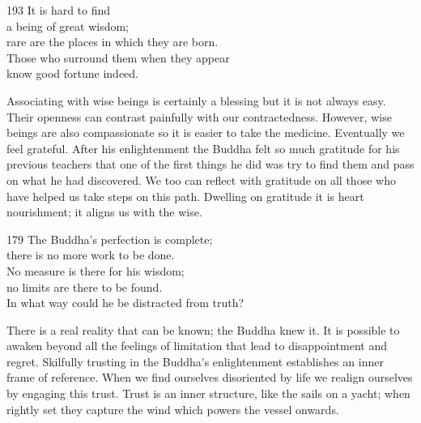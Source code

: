 
\begin{dhpVerse}{193}
\label{dhp-193}
It is hard to find\\
a being of great wisdom;\\
rare are the places in which they are born.\\
Those who surround them when they appear\\
know good fortune indeed.
\end{dhpVerse}

\begin{dhpRefl}

Associating with wise beings is certainly a blessing but it is not
always easy. Their openness can contrast painfully with our
contractedness. However, wise beings are also compassionate so it is
easier to take the medicine. Eventually we feel grateful. After his
enlightenment the Buddha felt so much gratitude for his previous
teachers that one of the first things he did was try to find them and
pass on what he had discovered. We too can reflect with gratitude on
all those who have helped us take steps on this path. Dwelling on
gratitude it is heart nourishment; it aligns us with the wise.

\end{dhpRefl}


\begin{dhpVerse}{179}
\label{dhp-179}
The Buddha's perfection is complete;\\
there is no more work to be done.\\
No measure is there for his wisdom;\\
no limits are there to be found.\\
In what way could he be distracted from truth?
\end{dhpVerse}

\begin{dhpRefl}

There is a real reality that can be known; the Buddha knew it. It is
possible to awaken beyond all the feelings of limitation that lead to
disappointment and regret. Skilfully trusting in the Buddha's
enlightenment establishes an inner frame of reference. When we find
ourselves disoriented by life we realign ourselves by engaging this
trust. Trust is an inner structure, like the sails on a yacht; when
rightly set they capture the wind which powers the vessel onwards.

\end{dhpRefl}

